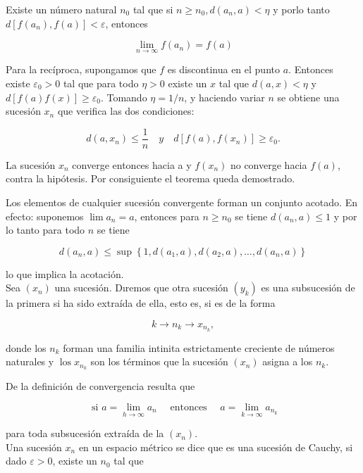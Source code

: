 \documentclass[10pt]{article}
\theoremstyle{plain}
\theoremstyle{definition}
\theoremstyle{remark}
\begin{document}
Existe un número natural $n_{0}$ tal que si $n \geqslant n_{0}, d\left(a_{n}, a\right)<\eta$ y porlo tanto $d\left[f\left(a_{n}\right), f(a)\right]<\varepsilon$, entonces

$$
\lim _{n \rightarrow \infty} f\left(a_{n}\right)=f(a)
$$

Para la recíproca, supongamos que $f$ es discontinua en el punto $a$. Entonces existe $\varepsilon_{0}>0$ tal que para todo $\eta>0$ existe un $x$ tal que $d(a, x)<\eta$ y $d[f(a) f(x)] \geqslant \varepsilon_{0}$. Tomando $\eta=1 / n$, y haciendo variar $n$ se obtiene una sucesión $x_{n}$ que verifica las dos condiciones:

$$
d\left(a, x_{n}\right) \leqslant \frac{1}{n} \quad y \quad d\left[f(a), f\left(x_{n}\right)\right] \geqslant \varepsilon_{0} .
$$

La sucesión $x_{n}$ converge entonces hacia a y $f\left(x_{n}\right)$ no converge hacia $f(a)$, contra la hipótesis. Por consiguiente el teorema queda demostrado.

Los elementos de cualquier sucesión convergente forman un conjunto acotado. En efecto: suponemos $\lim a_{n}=a$, entonces para $n \geqslant n_{0}$ se tiene $d\left(a_{n}, a\right) \leqslant 1$ y por lo tanto para todo $n$ se tiene

$$
d\left(a_{n}, a\right) \leqslant \sup \left\{1, d\left(a_{1}, a\right), d\left(a_{2}, a\right), \ldots, d\left(a_{n}, a\right)\right\}
$$

lo que implica la acotación.\\
Sea $\left(x_{n}\right)$ una sucesión. Dıremos que otra sucesión $\left(y_{k}\right)$ es una subsucesión de la primera si ha sido extraída de ella, esto es, si es de la forma

$$
k \rightarrow n_{k} \rightarrow x_{n_{k}},
$$

donde los $n_{k}$ forman una familia intinita estrictamente creciente de números naturales y $\operatorname{los} x_{n_{k}}$ son los términos que la sucesión $\left(x_{n}\right)$ asigna a los $n_{k}$.

De la definición de convergencia resulta que

$$
\text { si } a=\lim _{h \rightarrow \infty} a_{n} \quad \text { entonces } \quad a=\lim _{k \rightarrow \infty} a_{n_{k}}
$$

para toda subsucesión extraída de la $\left(x_{n}\right)$.\\
Una sucesión $x_{n}$ en un espacio métrico se dice que es una sucesión de Cauchy, si dado $\varepsilon>0$, existe un $n_{0}$ tal que
\end{document}
